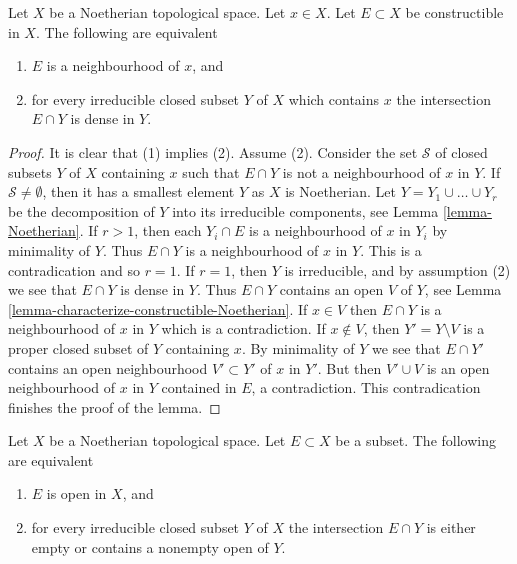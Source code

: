 \begin{lemma}
\label{lemma-construcible-neighbourhood-Noetherian}
Let $X$ be a Noetherian topological space.
Let $x \in X$.
Let $E \subset X$ be constructible in $X$.
The following are equivalent
\begin{enumerate}
\item $E$ is a neighbourhood of $x$, and
\item for every irreducible closed subset $Y$ of $X$ which contains
$x$ the intersection $E \cap Y$ is dense in $Y$.
\end{enumerate}
\end{lemma}

\begin{proof}
It is clear that (1) implies (2). Assume (2).
Consider the set $\mathcal{S}$ of closed subsets $Y$ of $X$ containing $x$
such that $E \cap Y$ is not a neighbourhood of $x$ in $Y$.
If $\mathcal{S} \not = \emptyset$, then it has a smallest element $Y$
as $X$ is Noetherian.
Let $Y = Y_1 \cup \ldots \cup Y_r$ be the decomposition of $Y$ into its
irreducible components, see
Lemma \ref{lemma-Noetherian}.
If $r > 1$, then each $Y_i \cap E$ is a neighbourhood of $x$ in $Y_i$
by minimality of $Y$. Thus $E \cap Y$ is a neighbourhood of $x$ in $Y$.
This is a contradication and so $r = 1$. If $r = 1$, then $Y$ is
irreducible, and by assumption (2) we see that $E \cap Y$
is dense in $Y$. Thus $E \cap Y$ contains an open $V$ of $Y$, see
Lemma \ref{lemma-characterize-constructible-Noetherian}.
If $x \in V$ then $E \cap Y$ is a neighbourhood of $x$ in $Y$ which
is a contradiction. If $x \not \in V$, then $Y' = Y \setminus V$ is a
proper closed subset of $Y$ containing $x$. By minimality of $Y$
we see that $E \cap Y'$ contains an open neighbourhood $V' \subset Y'$
of $x$ in $Y'$. But then $V' \cup V$ is an open neighbourhood of $x$
in $Y$ contained in $E$, a contradiction.
This contradication finishes the proof of the lemma.
\end{proof}

\begin{lemma}
\label{lemma-characterize-open-Noetherian}
Let $X$ be a Noetherian topological space.
Let $E \subset X$ be a subset.
The following are equivalent
\begin{enumerate}
\item $E$ is open in $X$, and
\item for every irreducible closed subset $Y$ of $X$
the intersection $E \cap Y$ is either empty or
contains a nonempty open of $Y$.
\end{enumerate}
\end{lemma}


